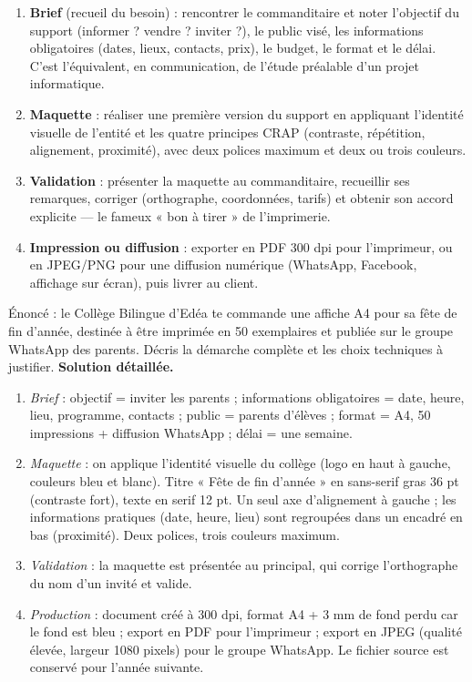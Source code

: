 \documentclass[11pt]{article}
\begin{document}
\begin{methode}
\begin{enumerate}
  \item \textbf{Brief} (recueil du besoin) : rencontrer le commanditaire et noter l'objectif du support (informer ? vendre ? inviter ?), le public visé, les informations obligatoires (dates, lieux, contacts, prix), le budget, le format et le délai. C'est l'équivalent, en communication, de l'étude préalable d'un projet informatique.
  \item \textbf{Maquette} : réaliser une première version du support en appliquant l'identité visuelle de l'entité et les quatre principes CRAP (contraste, répétition, alignement, proximité), avec deux polices maximum et deux ou trois couleurs.
  \item \textbf{Validation} : présenter la maquette au commanditaire, recueillir ses remarques, corriger (orthographe, coordonnées, tarifs) et obtenir son accord explicite — le fameux « bon à tirer » de l'imprimerie.
  \item \textbf{Impression ou diffusion} : exporter en PDF 300 dpi pour l'imprimeur, ou en JPEG/PNG pour une diffusion numérique (WhatsApp, Facebook, affichage sur écran), puis livrer au client.
\end{enumerate}
\end{methode}

\begin{exoresolu}
Énoncé : le Collège Bilingue d'Edéa te commande une affiche A4 pour sa fête de fin d'année, destinée à être imprimée en 50 exemplaires et publiée sur le groupe WhatsApp des parents. Décris la démarche complète et les choix techniques à justifier.
\tcblower
\textbf{Solution détaillée.}
\begin{enumerate}
  \item \emph{Brief} : objectif = inviter les parents ; informations obligatoires = date, heure, lieu, programme, contacts ; public = parents d'élèves ; format = A4, 50 impressions + diffusion WhatsApp ; délai = une semaine.
  \item \emph{Maquette} : on applique l'identité visuelle du collège (logo en haut à gauche, couleurs bleu et blanc). Titre « Fête de fin d'année » en sans-serif gras 36 pt (contraste fort), texte en serif 12 pt. Un seul axe d'alignement à gauche ; les informations pratiques (date, heure, lieu) sont regroupées dans un encadré en bas (proximité). Deux polices, trois couleurs maximum.
  \item \emph{Validation} : la maquette est présentée au principal, qui corrige l'orthographe du nom d'un invité et valide.
  \item \emph{Production} : document créé à 300 dpi, format A4 + 3 mm de fond perdu car le fond est bleu ; export en PDF pour l'imprimeur ; export en JPEG (qualité élevée, largeur 1080 pixels) pour le groupe WhatsApp. Le fichier source est conservé pour l'année suivante.
\end{enumerate}
\end{exoresolu}
\end{document}
